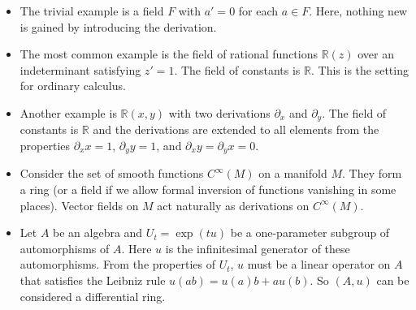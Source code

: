 \documentclass[12pt]{article}
\def\del{\partial}
\begin{document}
\begin{itemize}
\item
  The trivial example is a field $F$ with $a'=0$ for each $a\in F$. Here,
  nothing new is gained by introducing the derivation.
\item
  The most common example is the field of rational functions $\mathbb{R}(z)$
  over an indeterminant satisfying $z'=1$. The field of constants is
  $\mathbb{R}$. This is the setting for ordinary calculus.
\item
  Another example is $\mathbb{R}(x,y)$ with two derivations $\del_x$
  and $\del_y$. The field of constants is $\mathbb{R}$ and the
  derivations are extended to all elements from the properties $\del_x x=1$,
  $\del_y y = 1$, and $\del_x y = \del_y x = 0$.
\item
  Consider the set of smooth functions $C^\infty(M)$ on a manifold $M$. They
  form a ring (or a field if we allow formal inversion of functions
  vanishing in some places). Vector fields on $M$ act naturally as
  derivations on $C^\infty(M)$.
\item
  Let $A$ be an algebra and $U_t = \exp(tu)$ be a one-parameter subgroup of
  automorphisms of $A$. Here $u$ is the infinitesimal generator of these
  automorphisms. From the properties of $U_t$, $u$ must be a linear operator
  on $A$ that satisfies the Leibniz rule $u(ab)=u(a)b+au(b)$. So
  $(A,u)$ can be considered a differential ring.
\end{itemize}
\end{document}
